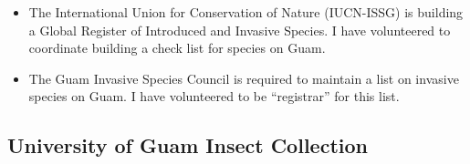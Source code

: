 \documentclass[12pt,english]{scrartcl}
\begin{document}
\begin{refsection}
\begin{itemize}

\item The International Union for Conservation of Nature (IUCN-ISSG) is
building a Global Register of Introduced and Invasive Species. I have
volunteered to coordinate building a check list for species on Guam.

\item The Guam Invasive Species Council is required to maintain a list on
invasive species on Guam. I have volunteered to be ``registrar''
for this list.

\end{itemize}

\printbibliography
\end{refsection}

\subsection{University of Guam Insect Collection}
\end{document}
